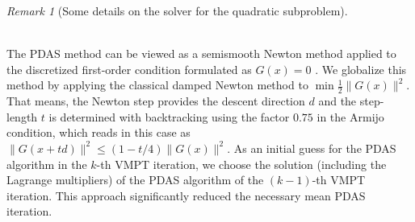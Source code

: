 \documentclass[a4paper,11pt]{article}
\theoremstyle{remark}
\newtheorem{remark}{Remark}%
\begin{document}
\begin{remark}[Some details on the solver for the quadratic subproblem]
  \label{DiscPdas}{\rm  \hfill \\
The PDAS method can be viewed as a semismooth Newton method applied to the discretized first-order condition formulated as $G(x)=0$ \cite{HIK02}.
We globalize this method by applying the classical damped Newton method to $\min \frac{1}{2}\|G(x)\|^2$. That means, the Newton step provides the descent direction $d$  and the step-length $t$ is determined with backtracking using the factor $0.75$ in the Armijo condition,
which reads in this case as $\| G(x+td)\|^2 \leq (1 - t/4 ) \| G(x) \|^2 $.
As an initial guess for the PDAS algorithm in the $k$-th VMPT iteration, we choose the solution (including the Lagrange multipliers) of the PDAS algorithm of the $(k-1)$-th VMPT iteration. 
This approach significantly reduced the necessary mean PDAS iteration.

}
\end{remark}
\end{document}
